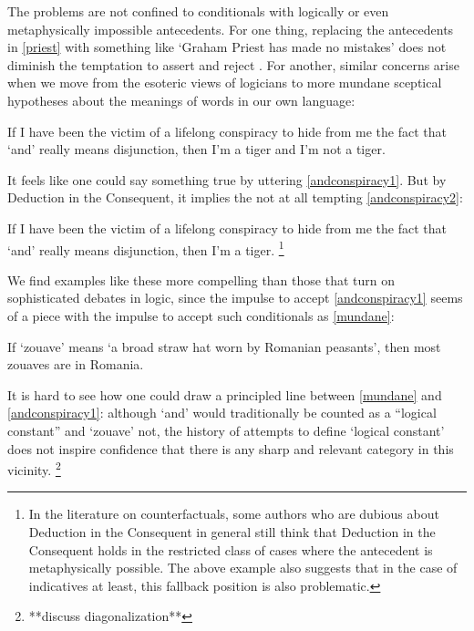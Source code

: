 \documentclass[If.tex]{subfiles}
\begin{document}
The problems are not confined to conditionals with logically or even metaphysically impossible antecedents.  For one thing, replacing the antecedents in \ref{priest} with something like ‘Graham Priest has made no mistakes’ does not diminish the temptation to assert  and reject .  For another, similar concerns arise when we move from the esoteric views of logicians to more mundane sceptical hypotheses about the meanings of words in our own language:
\begin{prop}
	\nitem \label{andconspiracy1}
	If I have been the victim of a lifelong conspiracy to hide from me the fact that ‘and’ really means disjunction, then I'm a tiger and I'm not a tiger.
\end{prop}	
It feels like one could say something true by uttering \ref{andconspiracy1}.
But by Deduction in the Consequent, it implies the not at all tempting \ref{andconspiracy2}:
\begin{prop}
	\nitem \label{andconspiracy2}
	If I have been the victim of a lifelong conspiracy to hide from me the fact that ‘and’ really means disjunction, then I'm a tiger.%
	\footnote{In the literature on counterfactuals, some authors who are dubious about Deduction in the Consequent in general still think that Deduction in the Consequent holds in the restricted class of cases where the antecedent is metaphysically possible.  The above example also suggests that in the case of indicatives at least, this fallback position is also problematic.}
\end{prop}
We find examples like these more compelling than those that turn on sophisticated debates in logic, since the impulse to accept \ref{andconspiracy1} seems of a piece with the impulse to accept such conditionals as \ref{mundane}:
\begin{prop}
	\nitem \label{mundane}
	If ‘zouave’ means ‘a broad straw hat worn by Romanian peasants’, then most zouaves are in Romania.  
\end{prop}
It is hard to see how one could draw a principled line between \ref{mundane} and \ref{andconspiracy1}: although ‘and’ would traditionally be counted as a “logical constant” and ‘zouave’ not, the history of attempts to define ‘logical constant’ does not inspire confidence that there is any sharp and relevant category in this vicinity.%
\footnote{**discuss diagonalization**}  
 
\end{document}
